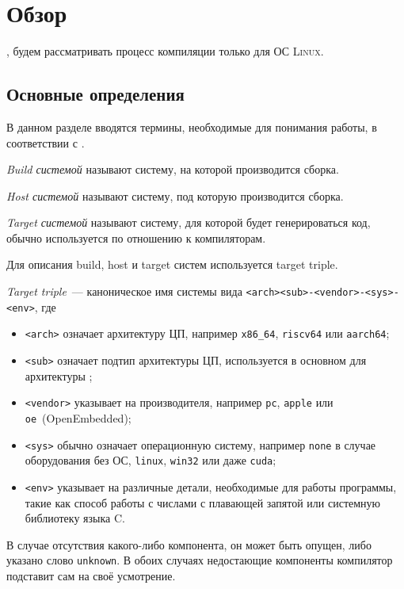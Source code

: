 
\section{Обзор}
\label{sec:relatedworks}
, будем рассматривать процесс компиляции только для ОС \textsc{Linux}.
\subsection{Основные определения}
\label{subsec:defs}

В данном разделе вводятся термины, необходимые для понимания работы, в соответствии с \cite{mackenzieCreatingAutomaticConfiguration2021, WelcomeClangDocumentation}.
\begin{definition}[Build]
	\textit{Build системой} называют систему, на которой производится сборка.
\end{definition}
\begin{definition}[Host]
	\textit{Host системой} называют систему, под которую производится сборка.
\end{definition}
\begin{definition}[Target]
	\textit{Target системой} называют систему, для которой будет генерироваться код, обычно используется по отношению к компиляторам.
\end{definition}

Для описания build, host и target систем используется target triple.

\begin{definition}
	\textit{Target triple}~--- каноническое имя системы вида \texttt{<arch><sub>-<vendor>-<sys>-<env>}, где
	\begin{itemize}
		\item \texttt{<arch>} означает архитектуру ЦП, например \texttt{x86\_64}, \texttt{riscv64} или \texttt{aarch64};
		\item \texttt{<sub>} означает подтип архитектуры ЦП, используется в основном для архитектуры \arm{};
		\item \texttt{<vendor>} указывает на производителя, например \texttt{pc}, \texttt{apple} или \texttt{oe}~(OpenEmbedded);
		\item \texttt{<sys>} обычно означает операционную систему, например \texttt{none} в случае оборудования без ОС, \texttt{linux}, \texttt{win32} или даже \texttt{cuda};
		\item \texttt{<env>} указывает на различные детали, необходимые для работы программы, такие как способ работы с числами с плавающей запятой или системную библиотеку языка \textsc{C}.
	\end{itemize}
	В случае отсутствия какого-либо компонента, он может быть опущен, либо указано слово \texttt{unknown}.
	В обоих случаях недостающие компоненты компилятор подставит сам на своё усмотрение.
\end{definition}

